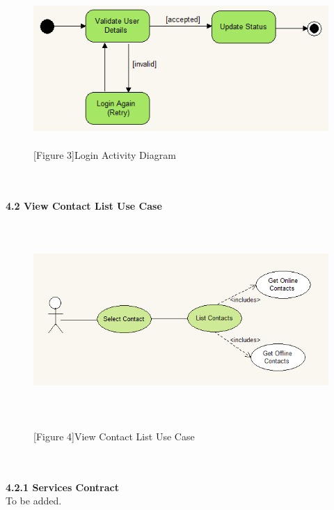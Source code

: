 \documentclass[29pt,a4paper]{moderncv}
\begin{document}
						\\ \begin{figure}
							\centering
						\\	\includegraphics[width=5.5in, height=2.0in]{./acLogin.png}
							\\\caption{[Figure 3]Login Activity Diagram}
						\end{figure}	\\

\newpage
	\\ \left\textbf{4.2 View Contact List Use Case} \\
		\begin{figure}
			\centering
			\\ \includegraphics[width=6.0in, height=2.5in]{./viewContactsCase.png} \\
			\\\caption{[Figure 4]View Contact List Use Case}
		\end{figure}\\
		
		\\ \noindent\textbf{4.2.1 Services Contract}\\
		To be added.\\
		
\end{document}
